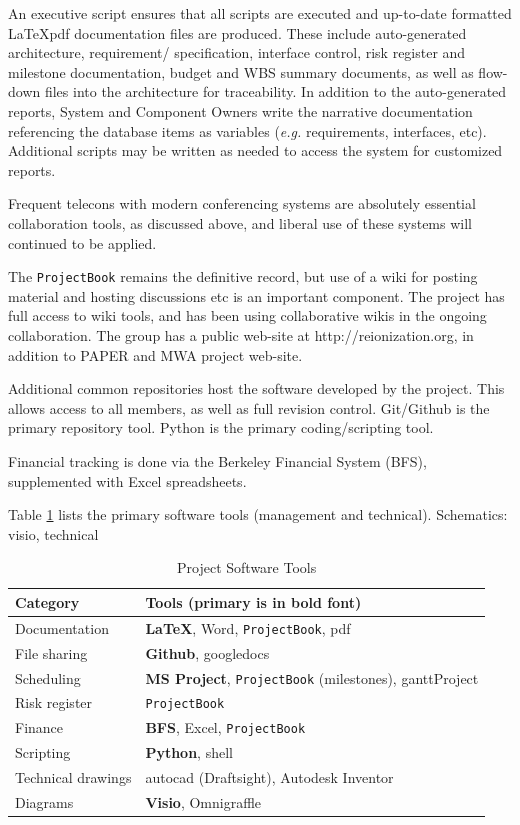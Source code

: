 \documentclass[preprint]{aastex}
\begin{document}
An executive script ensures that all scripts are executed and up-to-date formatted \LaTeX pdf documentation
files are produced.  These include auto-generated architecture, requirement/ specification, 
interface control, risk register and milestone documentation, budget and WBS summary documents, as well as
flow-down files into the architecture for traceability. 
In addition to the auto-generated reports, System and  Component Owners write the narrative 
documentation referencing the database items as variables ({\em e.g.} requirements, interfaces, etc).
Additional scripts may be written as needed to access the system for customized reports.

Frequent telecons with modern conferencing systems are absolutely essential collaboration tools, 
as discussed above, and liberal use of these systems will continued to be applied.

The {\tt ProjectBook} remains the definitive record, but use of a wiki for posting material and hosting
discussions etc is an important component.  The project has full access to wiki tools, and has been
using collaborative wikis in the ongoing collaboration.  The group has a public web-site at http://reionization.org, 
in addition to PAPER and MWA project web-site.

Additional common repositories host the software developed by the project.  This allows access to all members,
as well as full revision control.  Git/Github is the primary repository tool.  Python is the primary coding/scripting
tool.

Financial tracking is done via the Berkeley Financial System (BFS), supplemented with Excel spreadsheets.

Table \ref{tab:softwareTools} lists the primary software tools (management and technical).  Schematics:  visio, technical
\begin{table}[h]
\centering
\caption{Project Software Tools}
\label{tab:softwareTools}
\begin{tabular}{| p{1in} | p{5in} |}\hline
\textbf{Category} & \textbf{Tools (primary is in bold font)} \\ \hline
Documentation & \textbf{\LaTeX}, Word, {\tt ProjectBook}, pdf \\ \hline
File sharing & \textbf{Github}, googledocs \\ \hline
Scheduling & \textbf{MS Project}, {\tt ProjectBook} (milestones), ganttProject \\ \hline
Risk register & {\tt ProjectBook}\\ \hline
Finance & \textbf{BFS}, Excel, {\tt ProjectBook} \\ \hline
Scripting & \textbf{Python}, shell \\ \hline
Technical drawings & autocad (Draftsight), Autodesk Inventor \\ \hline
Diagrams & \textbf{Visio}, Omnigraffle \\ \hline
\end{tabular}
\end{table}
\end{document}
